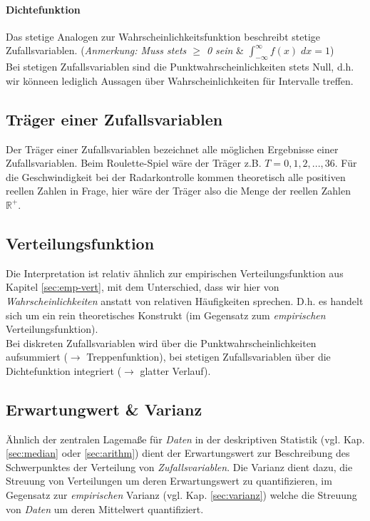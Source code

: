 \documentclass[a4paper]{article}
\newcommand{\R}{\mathbb{R}}
\newcommand\dangersign[1][2ex]{%
  \renewcommand\stacktype{L}%
  \scaleto{\stackon[1.3pt]{\color{red}$\triangle$}{\tiny !}}{#1}%
}
\begin{document}
\paragraph{Dichtefunktion} Das stetige Analogen zur Wahrscheinlichkeitsfunktion beschreibt stetige Zufallsvariablen. (\textit{Anmerkung: Muss stets $\geq$ 0 sein }\& $\int_{-\infty}^{\infty} f(x)\; dx = 1$)\\

\noindent \dangersign[3ex] Bei stetigen Zufallsvariablen sind die Punktwahrscheinlichkeiten stets Null, d.h. wir könneen lediglich Aussagen über Wahrscheinlichkeiten für Intervalle treffen.

\subsection{Träger einer Zufallsvariablen} \label{sec:traeger}

Der Träger einer Zufallsvariablen bezeichnet alle möglichen Ergebnisse einer Zufallsvariablen. Beim Roulette-Spiel wäre der Träger z.B. $ T = 0,1,2,...,36$. Für die Geschwindigkeit bei der Radarkontrolle kommen theoretisch alle positiven reellen Zahlen in Frage, hier wäre der Träger also die Menge der reellen Zahlen $\R^+$.

\subsection{Verteilungsfunktion}\label{sec:vtlgfkt}

Die Interpretation ist relativ ähnlich zur empirischen Verteilungsfunktion aus Kapitel \ref{sec:emp-vert}, mit dem Unterschied, dass wir hier von \textit{Wahrscheinlichkeiten} anstatt von relativen Häufigkeiten sprechen. D.h. es handelt sich um ein rein theoretisches Konstrukt (im Gegensatz zum \textit{empirischen} Verteilungsfunktion).\\

\noindent \dangersign[3ex] Bei diskreten Zufallsvariablen wird über die Punktwahrscheinlichkeiten aufsummiert ($\rightarrow$ Treppenfunktion), bei stetigen Zufallsvariablen über die Dichtefunktion integriert ($\rightarrow$ glatter Verlauf).

\subsection{Erwartungwert \& Varianz}\label{sec:ex-var}

Ähnlich der zentralen Lagemaße für \textit{Daten} in der deskriptiven Statistik (vgl. Kap. \ref{sec:median} oder \ref{sec:arithm}) dient der Erwartungswert zur Beschreibung des Schwerpunktes der Verteilung von \textit{Zufallsvariablen}. Die Varianz dient dazu, die Streuung von Verteilungen um deren Erwartungswert zu quantifizieren, im Gegensatz zur \textit{empirischen} Varianz (vgl. Kap. \ref{sec:varianz}) welche die Streuung von \textit{Daten} um deren Mittelwert quantifiziert.\\
\end{document}
